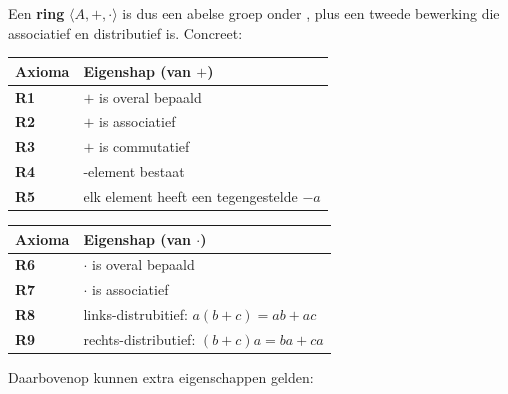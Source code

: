 Een \textbf{ring} $\langle A, +, \cdot \rangle$ is dus een abelse groep onder \inlinetext{$+$}, plus een tweede bewerking \inlinetext{$\cdot$} die associatief en distributief is. Concreet:

\begin{center}
    \renewcommand{\arraystretch}{1.5}
    \begin{tabularx}{\linewidth}{@{} >{\hsize}L >{\hsize}L @{}}
        \textbf{Axioma} & \textbf{Eigenshap (van $+$)} \\
        \hline
        \textbf{R1} & $+$ is overal bepaald  \\
        \thinrule
        \textbf{R2} & $+$ is associatief  \\
        \thinrule
        \textbf{R3} & $+$ is commutatief  \\
        \thinrule
        \textbf{R4} & 0-element bestaat \\
        \thinrule
        \textbf{R5} & elk element heeft een tegengestelde $-a$ \\
        \hline
    \end{tabularx}
\end{center}

\begin{center}
    \renewcommand{\arraystretch}{1.5}
    \begin{tabularx}{\linewidth}{@{} >{\hsize}L >{\hsize}L @{}}
        \textbf{Axioma} & \textbf{Eigenshap (van $\cdot$)} \\
        \hline
        \textbf{R6} & $\cdot$ is overal bepaald  \\
        \thinrule
        \textbf{R7} & $\cdot$ is associatief  \\
        \thinrule
        \textbf{R8} & links-distrubitief: $a(b+c) = ab+ac$  \\
        \thinrule
        \textbf{R9} & rechts-distributief: $(b+c)a = ba + ca$ \\
        \hline
    \end{tabularx}
\end{center}

Daarbovenop kunnen extra eigenschappen gelden:

